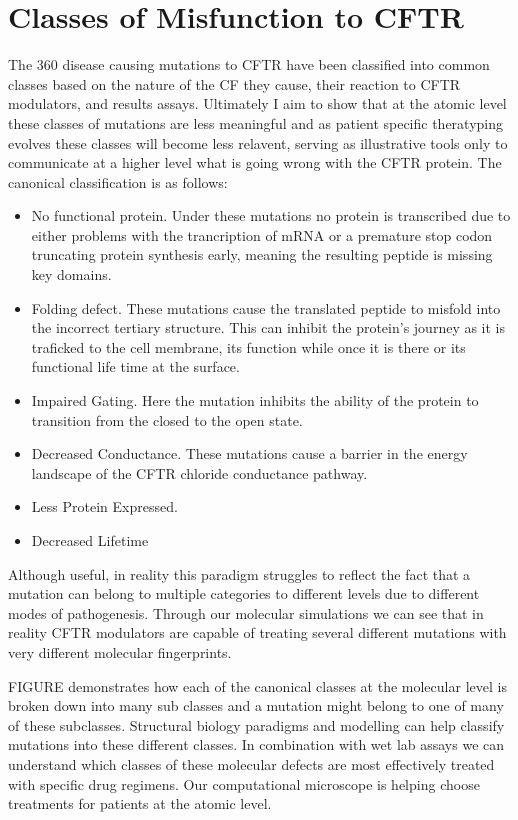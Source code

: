 \section{Classes of Misfunction to CFTR}
The 360 disease causing mutations to CFTR have been classified into common classes based on the nature of the CF they cause, their reaction to CFTR modulators, and results  assays. Ultimately I aim to show that at the atomic level these classes of mutations are less meaningful and as patient specific theratyping evolves these classes will become less relavent, serving as illustrative tools only to communicate at a higher level what is going wrong with the CFTR protein. The canonical classification is as follows:
\begin{itemize}
	\item {} No functional protein. Under these mutations no protein is transcribed due to either problems with the trancription of mRNA or a premature stop codon truncating protein synthesis early, meaning the resulting peptide is missing key domains. 
	\item {} Folding defect. These mutations cause the translated peptide to misfold into the incorrect tertiary structure. This can inhibit the protein's journey as it is traficked to the cell membrane, its function while once it is there or its functional life time at the surface. 
	\item {} Impaired Gating. Here the mutation inhibits the ability of the protein to transition from the closed to the open state. 
	\item {} Decreased Conductance. These mutations cause a barrier in the energy landscape of the CFTR chloride conductance pathway.
	\item {} Less Protein Expressed.  
	\item {} Decreased Lifetime

\end{itemize}

Although useful, in reality this paradigm struggles to reflect the fact that a mutation can belong to multiple categories to different levels due to different modes of pathogenesis. Through our molecular simulations we can see that in reality CFTR modulators are capable of treating several different mutations with very different molecular fingerprints.

FIGURE demonstrates how each of the canonical classes at the molecular level is broken down into many sub classes and a mutation might belong to one of many of these subclasses. Structural biology paradigms and  modelling can help classify mutations into these different classes. In combination with wet lab assays we can understand which classes of these molecular defects are most effectively treated with specific drug regimens. Our computational microscope is helping choose treatments for patients at the atomic level. 

